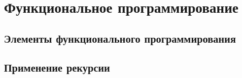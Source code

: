 \section{Функциональное программирование}

\subsection{Элементы функционального программирования}

\subsection{Применение рекурсии}
